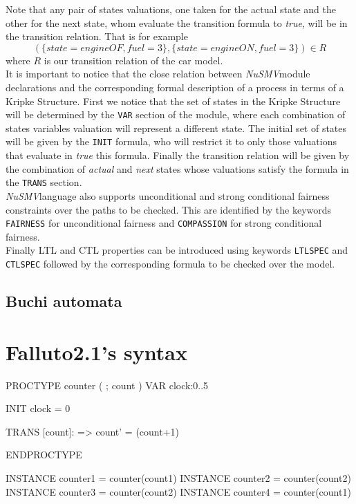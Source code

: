 \documentclass[12pt]{article}
\newcommand{\nusmv}{\mbox{\textit{NuSMV}}}
\begin{document}
Note that any pair of states valuations, one taken for the actual state and the
other for the next state, whom evaluate the transition formula to \emph{true},
will be in the transition relation. That is for example
$$(\{state=engineOF, fuel=3\},\{state=engineON,fuel=3\}) \in R$$ where $R$ is our
transition relation of the car model.\\
It is important to notice that the close relation between \nusmv module declarations and the corresponding formal description of a process in terms of a Kripke Structure. First we notice that the set of states in the Kripke Structure will be determined by the \texttt{VAR} section of the module, where each combination of states variables valuation will represent a different state. The initial set of states will be given by the \texttt{INIT} formula, who will restrict it to only those valuations that evaluate in \textit{true} this formula. Finally the transition relation will be given by the combination of \textit{actual} and \textit{next} states whose valuations satisfy the formula in the \texttt{TRANS} section.\\
\nusmv language also supports unconditional and strong conditional fairness constraints over the paths to be checked. This are identified by the keywords \texttt{FAIRNESS} for unconditional fairness and \texttt{COMPASSION} for strong conditional fairness.\\
Finally LTL and CTL properties can be introduced using keywords \texttt{LTLSPEC} and \texttt{CTLSPEC} followed by the corresponding formula to be checked over the model.


\subsection{Buchi automata}\label{buchi}


\section{Falluto2.1's syntax}

\begin{verbbox}
PROCTYPE counter ( ; count )
    VAR
        clock:0..5

    INIT
        clock = 0

    TRANS
        [count]: => count' = (count+1)%

ENDPROCTYPE

INSTANCE counter1 = counter(count1)
INSTANCE counter2 = counter(count2)
INSTANCE counter3 = counter(count2)
INSTANCE counter4 = counter(count1)

\end{verbbox}
\end{document}
